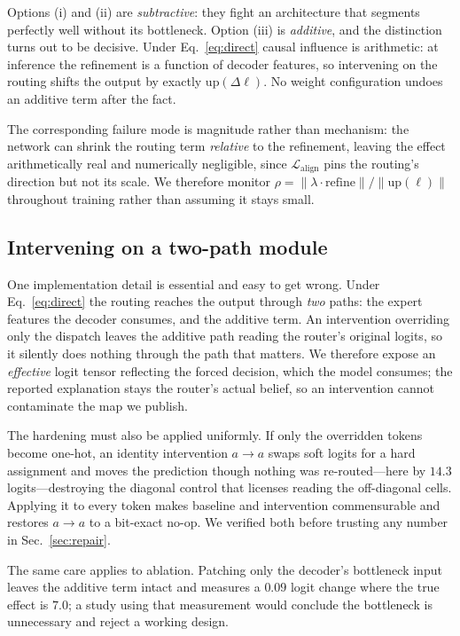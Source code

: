 Options (i) and (ii) are \emph{subtractive}: they fight an architecture that segments perfectly
well without its bottleneck. Option (iii) is \emph{additive}, and the distinction turns out to be
decisive. Under Eq.~\ref{eq:direct} causal influence is arithmetic: at inference the refinement is
a function of decoder features, so intervening on the routing shifts the output by exactly
$\mathrm{up}(\Delta\ell)$. No weight configuration undoes an additive term after the fact.

The corresponding failure mode is magnitude rather than mechanism: the network can shrink the
routing term \emph{relative} to the refinement, leaving the effect arithmetically real and
numerically negligible, since $\mathcal{L}_{\text{align}}$ pins the routing's direction but not its
scale. We therefore monitor $\rho=\lVert\lambda\cdot\text{refine}\rVert/\lVert\mathrm{up}(\ell)\rVert$
throughout training rather than assuming it stays small.

\subsection{Intervening on a two-path module}
\label{sec:twopath}
One implementation detail is essential and easy to get wrong. Under Eq.~\ref{eq:direct} the
routing reaches the output through \emph{two} paths: the expert features the decoder consumes, and
the additive term. An intervention overriding only the dispatch leaves the additive path reading
the router's original logits, so it silently does nothing through the path that matters. We
therefore expose an \emph{effective} logit tensor reflecting the forced decision, which the model
consumes; the reported explanation stays the router's actual belief, so an intervention cannot
contaminate the map we publish.

The hardening must also be applied uniformly. If only the overridden tokens become one-hot, an
identity intervention $a\!\to\!a$ swaps soft logits for a hard assignment and moves the prediction
though nothing was re-routed---here by $14.3$ logits---destroying the diagonal control that
licenses reading the off-diagonal cells. Applying it to every token makes baseline and
intervention commensurable and restores $a\!\to\!a$ to a bit-exact no-op. We verified both before
trusting any number in Sec.~\ref{sec:repair}.

The same care applies to ablation. Patching only the decoder's bottleneck input leaves the
additive term intact and measures a $0.09$ logit change where the true effect is $7.0$; a study
using that measurement would conclude the bottleneck is unnecessary and reject a working design.
